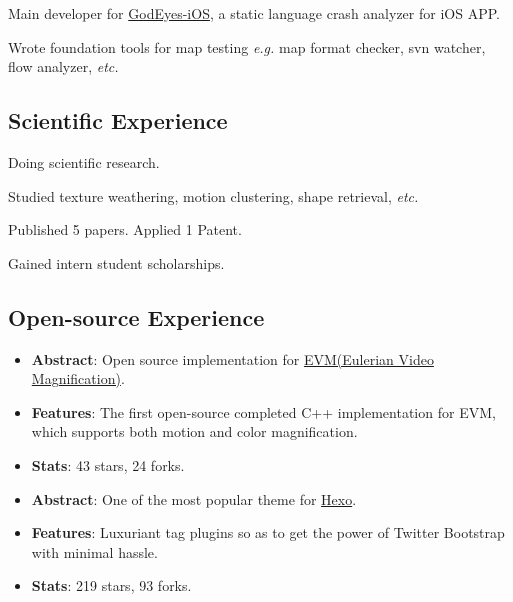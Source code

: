 {
\begin{tightitemize}%
 \item Main developer for \href{http://godeyes.duapp.com}{GodEyes-iOS}, a static
   language crash analyzer for iOS APP. 
 \item Wrote foundation tools for
   map testing \textsl{e.g.} map format checker, svn
   watcher, flow analyzer, \textsl{etc.}
 \end{tightitemize}}

\subsection{Scientific Experience}

{Doing scientific research.
\begin{tightitemize}%
 \item Studied texture weathering, motion clustering, shape retrieval, \textsl{etc.}
 \item Published 5 papers. Applied 1 Patent.
 \item Gained intern student scholarships. 
 \end{tightitemize}}

\subsection{Open-source Experience}

%
  {
\begin{itemize}
\item \textbf{Abstract}: Open source implementation for \href{http://people.csail.mit.edu/mrub/vidmag/}{EVM(Eulerian Video Magnification)}.
\item \textbf{Features}: The first open-source completed C++ implementation for EVM, which supports both motion and color magnification.
\item \textbf{Stats}: 43 stars, 24 forks.
\end{itemize}}

%
  {
\begin{itemize}
\item \textbf{Abstract}: One of the most popular theme for \href{hexo.io}{Hexo}.
\item \textbf{Features}: Luxuriant tag plugins so as to get the power of Twitter Bootstrap with minimal hassle.
\item \textbf{Stats}: 219 stars, 93 forks.
\end{itemize}}

